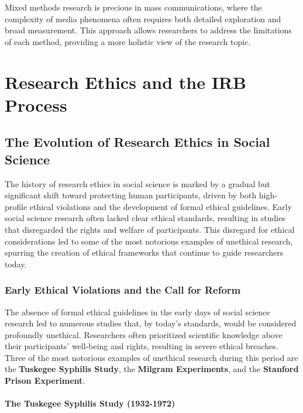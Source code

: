 \documentclass[
]{book}
\begin{document}
Mixed methods research is precious in mass communications, where the complexity of media phenomena often requires both detailed exploration and broad measurement. This approach allows researchers to address the limitations of each method, providing a more holistic view of the research topic.

\chapter{Research Ethics and the IRB Process}\label{research-ethics-and-the-irb-process}

\section{The Evolution of Research Ethics in Social Science}\label{the-evolution-of-research-ethics-in-social-science}

The history of research ethics in social science is marked by a gradual but significant shift toward protecting human participants, driven by both high-profile ethical violations and the development of formal ethical guidelines. Early social science research often lacked clear ethical standards, resulting in studies that disregarded the rights and welfare of participants. This disregard for ethical considerations led to some of the most notorious examples of unethical research, spurring the creation of ethical frameworks that continue to guide researchers today.

\subsection*{Early Ethical Violations and the Call for Reform}\label{early-ethical-violations-and-the-call-for-reform}

The absence of formal ethical guidelines in the early days of social science research led to numerous studies that, by today's standards, would be considered profoundly unethical. Researchers often prioritized scientific knowledge above their participants' well-being and rights, resulting in severe ethical breaches. Three of the most notorious examples of unethical research during this period are the \textbf{Tuskegee Syphilis Study}, the \textbf{Milgram Experiments}, and the \textbf{Stanford Prison Experiment}.

\subsubsection*{The Tuskegee Syphilis Study (1932-1972)}\label{the-tuskegee-syphilis-study-1932-1972}
\end{document}
